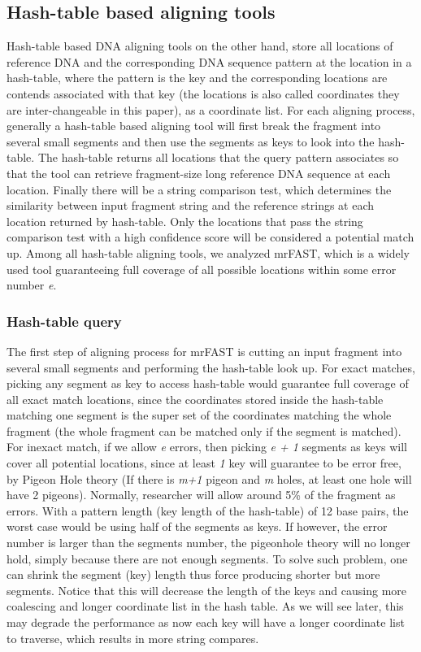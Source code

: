 \subsection{Hash-table based aligning tools} \label{hash_tool}

Hash-table based DNA aligning tools on the other hand, store all locations of
reference DNA and the corresponding DNA sequence pattern at the location in a
hash-table, where the pattern is the key and the corresponding locations are
contends associated with that key (the locations is also called coordinates
they are inter-changeable in this paper), as a coordinate list. For each
aligning process, generally a hash-table based aligning tool will first break
the fragment into several small segments and then use the segments as keys to
look into the hash-table.  The hash-table returns all locations that the query
pattern associates so that the tool can retrieve fragment-size long reference
DNA sequence at each location.  Finally there will be a string comparison test,
which determines the similarity between input fragment string and the reference
strings at each location returned by hash-table. Only the locations that pass
the string comparison test with a high confidence score will be considered a
potential match up. Among all hash-table aligning tools, we analyzed mrFAST,
which is a widely used tool guaranteeing full coverage of all possible
locations within some error number \textit{e}. 

\subsubsection{Hash-table query} \label{hash_query}

The first step of aligning process for mrFAST is cutting an input fragment into
several small segments and performing the hash-table look up. For exact
matches, picking any segment as key to access hash-table would guarantee full
coverage of all exact match locations, since the coordinates stored inside the
hash-table matching one segment is the super set of the coordinates matching
the whole fragment (the whole fragment can be matched only if the segment is
matched). For inexact match, if we allow \textit{e} errors, then picking
\textit{e + 1} segments as keys will cover all potential locations, since at
least \textit{1} key will guarantee to be error free, by Pigeon Hole theory (If
there is \textit{m+1} pigeon and \textit{m} holes, at least one hole will have 2
pigeons). Normally, researcher will allow around 5\% of the fragment as
errors. With a pattern length (key length of the hash-table) of 12 base pairs,
the worst case would be using half of the segments as keys. If however, the
error number is larger than the segments number, the pigeonhole theory will no
longer hold, simply because there are not enough segments. To solve such
problem, one can shrink the segment (key) length thus force producing shorter
but more segments. Notice that this will decrease the length of the keys and
causing more coalescing and longer coordinate list in the hash table. As we
will see later, this may degrade the performance as now each key will have a
longer coordinate list to traverse, which results in more string compares.\\

